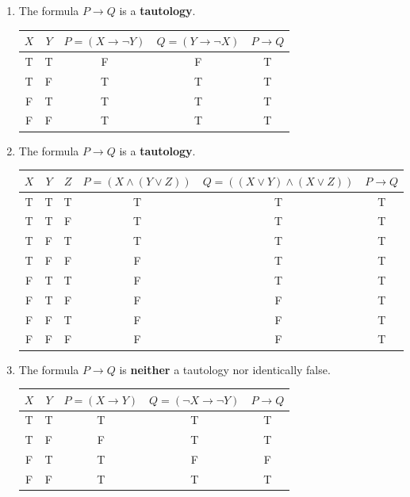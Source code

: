 \documentclass[12pt]{article}
\newcommand{\p}[1]{\item[\textnormal{(#1)}]}
\newenvironment{ps}
{\begin{enumerate}[leftmargin=0em, itemindent=1.5em]}
{\end{enumerate}}
\begin{document}
\begin{ps}
    \p{iv} The formula \(P \rightarrow Q\) is a \textbf{tautology}.

        \begin{center}
        \begin{tabular}{|c|c|c|c|c|}
        \hline
        $X$ & $Y$ & $P = (X \rightarrow \neg Y)$ & $Q = (Y \rightarrow \neg X)$ & $P \rightarrow Q$ \\
        \hline
        T & T & F & F & T \\
        T & F & T & T & T \\
        F & T & T & T & T \\
        F & F & T & T & T \\
        \hline
        \end{tabular}
        \end{center}

    \p{v} The formula \(P \rightarrow Q\) is a \textbf{tautology}.

        \begin{center}
        \begin{tabular}{|c|c|c|c|c|c|}
        \hline
        $X$ & $Y$ & $Z$ & $P = (X \wedge (Y \vee Z))$ & $Q = ((X \vee Y) \wedge (X \vee Z))$ & $P \rightarrow Q$ \\
        \hline
        T & T & T & T & T & T \\
        T & T & F & T & T & T \\
        T & F & T & T & T & T \\
        T & F & F & F & T & T \\
        F & T & T & F & T & T \\
        F & T & F & F & F & T \\
        F & F & T & F & F & T \\
        F & F & F & F & F & T \\
        \hline
        \end{tabular}
        \end{center}

    \p{vi} The formula \(P \rightarrow Q\) is \textbf{neither} a tautology nor identically
    false.

        \begin{center}
        \begin{tabular}{|c|c|c|c|c|}
        \hline
        $X$ & $Y$ & $P = (X \rightarrow Y)$ & $Q = (\neg X \rightarrow \neg Y)$ & $P \rightarrow Q$ \\
        \hline
        T & T & T & T & T \\
        T & F & F & T & T \\
        F & T & T & F & F \\
        F & F & T & T & T \\
        \hline
        \end{tabular}
        \end{center}


\end{ps}
\end{document}
